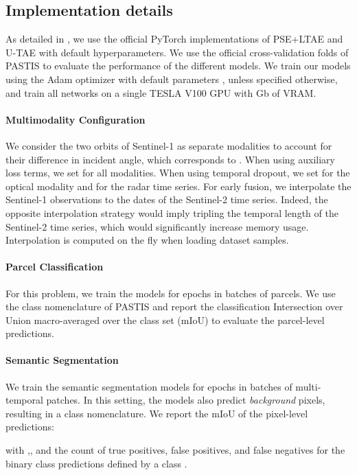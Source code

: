 \subsection{Implementation details}
As detailed in , we use the official PyTorch implementations of PSE+LTAE and U-TAE with default hyperparameters.
We  use the official  cross-validation folds of PASTIS \citep{garnot2021utae} to evaluate the performance of the different models. We train our models using the Adam optimizer \citep{kingma2014adam} with default parameters ,  unless specified otherwise, and train all networks on a single TESLA V100 GPU with Gb of VRAM. 

\paragraph{\bf Multimodality Configuration}  We consider the two orbits of Sentinel-1 as separate modalities to account for their difference in incident angle, which corresponds to . When using auxiliary loss terms, we set  for all modalities. When using temporal dropout, we set  for the optical modality and  for the radar time series. For early fusion, we interpolate the Sentinel-1 observations to the dates of the Sentinel-2 time series. Indeed, the opposite interpolation strategy would imply tripling the temporal length of the Sentinel-2 time series, which would significantly increase memory usage. Interpolation is computed on the fly when loading dataset samples. 

\paragraph{\bf Parcel Classification} For this problem, we train the models for  epochs in batches of  parcels. We use the  class nomenclature of PASTIS and report the classification Intersection over Union macro-averaged over the class set (mIoU) to evaluate the parcel-level predictions. 

\paragraph{\bf Semantic Segmentation} We train the semantic segmentation models for  epochs in batches of  multi-temporal patches. In this setting, the models also predict \emph{background} pixels, resulting in a  class nomenclature. We report the mIoU of the pixel-level predictions: 

with ,, and  the count of true positives, false positives, and false negatives for the binary class predictions defined by a class .
